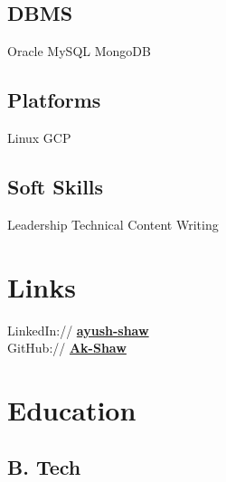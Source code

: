 \documentclass[]{deedy-resume-openfont}
\begin{document}
\begin{minipage}[t]{0.33\textwidth}
\subsection{DBMS}
Oracle \textbullet{} MySQL \textbullet{} MongoDB
\sectionsep

\subsection{Platforms}
Linux \textbullet{} GCP 
\sectionsep

\subsection{Soft Skills}
Leadership \textbullet{} Technical Content Writing 
\sectionsep


\section{Links} 
LinkedIn://  \href{https://www.linkedin.com/in/ayush-shaw}{\bf ayush-shaw} \\
GitHub://  \href{https://github.com/Ak-Shaw}{\bf Ak-Shaw} \\


\section{Education} 


\subsection{B. Tech} 
\sectionsep



\end{minipage}
\end{document}
